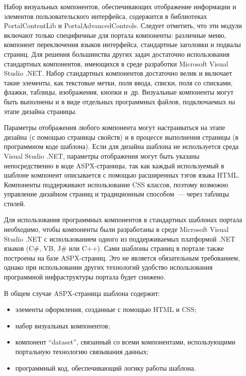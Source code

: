 \begin{multicols}{2}
 Набор визуальных компонентов, обес\-пе\-чи\-ва\-ющих отображение информации и
элементов пользовательского интерфейса, содержится в библиотеках PortalContentLib и
PortalAdvancedControls. %
 Следу\-ет отметить, что эти модули включают только специфичные
для портала компоненты: различные меню, компонент переключения языков интерфейса,
стандартные заголовки и подвалы страниц. Для решения большинства других задач
достаточно использования стандартных компонентов, имеющихся в среде разработки
Microsoft Visual Studio .NET. Набор стандартных компонентов достаточно велик и
включает такие элементы, как текстовые метки, поля ввода, списки, поля со списками,
флажки, таблицы, изображения, кнопки и~др. Визуальные компоненты могут быть
выполнены и в виде отдельных программных файлов, подключаемых на этапе дизайна
страницы.

 Параметры отображения любого компонента могут настраиваться на этапе дизайна
(с помощью страницы свойств) и в процессе выполнения страницы (в программном коде
шаблона). Если для дизайна шаблона не используется среда Visual Studio .NET, параметры
отображения могут быть указаны непосредственно в коде ASPX-страницы, так как
каждый используемый в шаблоне компонент описывается с помощью расширенных тэгов
языка HTML. Компоненты поддерживают использование CSS классов, поэтому возможно
управление дизайном страниц и традиционным способом~--- через таблицы стилей.

 Для использования программных компонентов в стандартных шаблонах портала
необходимо, чтобы компоненты были разработаны в среде Microsoft Visual Studio .NET с
использованием одного из поддерживаемых платформой .NET языков (C\#, VB, J\# или
C++). Сами шаблоны страниц в портале также построены на базе ASPX-страниц. Это не
является обязательным требованием, однако при использовании других технологий
удобство использования программной инфраструктуры портала будет снижено.

 В общем случае ASPX-страница шаблона содержит:
 \begin{itemize}
\item элементы оформления, созданные с помощью HTML и CSS;
\item набор визуальных компонентов;
\item компонент ``dataset'', связанный со всеми компонентами, использующими
портальную технологию связывания данных;
\item программный код, обеспечивающий логику работы шаблона.
\end{itemize}


\end{multicols}
